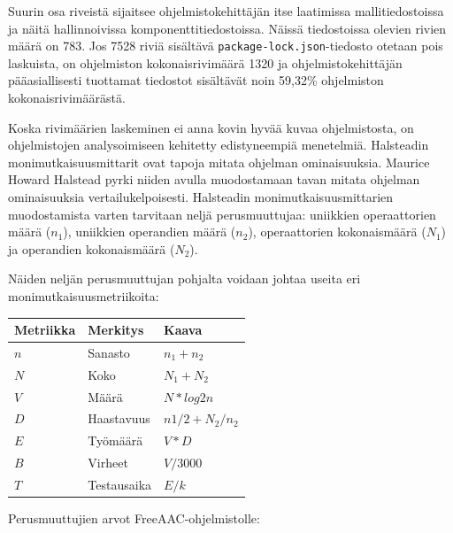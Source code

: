 \documentclass[utf8]{gradu3}
\begin{document}
Suurin osa riveistä sijaitsee ohjelmistokehittäjän itse laatimissa mallitiedostoissa ja näitä hallinnoivissa komponenttitiedostoissa. Näissä tiedostoissa olevien rivien määrä on 783. Jos 7528 riviä sisältävä \texttt{package-lock.json}-tiedosto otetaan pois laskuista, on ohjelmiston kokonaisrivimäärä 1320 ja ohjelmistokehittäjän pääasiallisesti tuottamat tiedostot sisältävät noin 59,32\% ohjelmiston kokonaisrivimäärästä.

Koska rivimäärien laskeminen ei anna kovin hyvää kuvaa ohjelmistosta, on ohjelmistojen analysoimiseen kehitetty edistyneempiä menetelmiä. Halsteadin monimutkaisuusmittarit ovat tapoja mitata ohjelman ominaisuuksia. Maurice Howard Halstead pyrki niiden avulla muodostamaan tavan mitata ohjelman ominaisuuksia vertailukelpoisesti. Halsteadin monimutkaisuusmittarien muodostamista varten tarvitaan neljä perusmuuttujaa: uniikkien operaattorien määrä ($n_1$), uniikkien operandien määrä ($n_2$), operaattorien kokonaismäärä ($N_1$) ja operandien kokonaismäärä ($N_2$).

Näiden neljän perusmuuttujan pohjalta voidaan johtaa useita eri monimutkaisuusmetriikoita:

\begin{center}
    \begin{tabular}{ | l | l | l |}
    \hline
    \textbf{Metriikka} & \textbf{Merkitys} & \textbf{Kaava} \\ \hline
    $n$ & Sanasto & $n_1 + n_2$ \\ \hline
    $N$ & Koko & $N_1 + N_2$ \\ \hline
    $V$ & Määrä & $N * log2 n$ \\ \hline
    $D$ & Haastavuus & $n1/2 + N_2/n_2$ \\ \hline
    $E$ & Työmäärä & $V * D$ \\ \hline
    $B$ & Virheet & $V / 3000$ \\ \hline
    $T$ & Testausaika & $E / k$ \\ \hline
    \end{tabular}
\end{center}

Perusmuuttujien arvot FreeAAC-ohjelmistolle:
\end{document}

